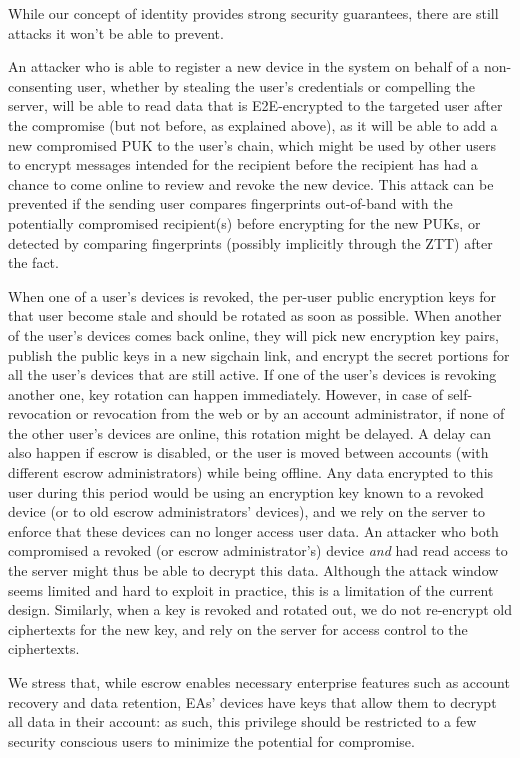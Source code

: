 While our concept of identity provides strong security guarantees, there are still attacks it won't
be able to prevent.

An attacker who is able to register a new device in the system on behalf of a non-consenting user,
whether by stealing the user's credentials or compelling the server, will be able to read data that
is E2E-encrypted to the targeted user after the compromise (but not before, as explained above), as
it will be able to add a new compromised PUK to the user's chain, which might be used by other users
to encrypt messages intended for the recipient before the recipient has had a chance to come online
to review and revoke the new device. This attack can be prevented if the sending user compares
fingerprints out-of-band with the potentially compromised recipient(s) before encrypting for the new
PUKs, or detected by comparing fingerprints (possibly implicitly through the ZTT) after the fact.

When one of a user's devices is revoked, the per-user public encryption keys for that user become
stale and should be rotated as soon as possible. When another of the user's devices comes back
online, they will pick new encryption key pairs, publish the public keys in a new sigchain link, and
encrypt the secret portions for all the user's devices that are still active. If one of the user's
devices is revoking another one, key rotation can happen immediately. However, in case of
self-revocation or revocation from the web or by an account administrator, if none of the other
user's devices are online, this rotation might be delayed. A delay can also happen if escrow is
disabled, or the user is moved between accounts (with different escrow administrators) while being
offline. Any data encrypted to this user during this period would be using an encryption key known
to a revoked device (or to old escrow administrators' devices), and we rely on the server to enforce
that these devices can no longer access user data. An attacker who both compromised a revoked (or
escrow administrator's) device \textit{and} had read access to the server might thus be able to
decrypt this data. Although the attack window seems limited and hard to exploit in practice, this is
a limitation of the current design. Similarly, when a key is revoked and rotated out, we do not
re-encrypt old ciphertexts for the new key, and rely on the server for access control to the
ciphertexts.

We stress that, while escrow enables necessary enterprise features such as account recovery and data
retention, EAs' devices have keys that allow them to decrypt all data in their account: as such,
this privilege should be restricted to a few security conscious users to minimize the potential for
compromise.

